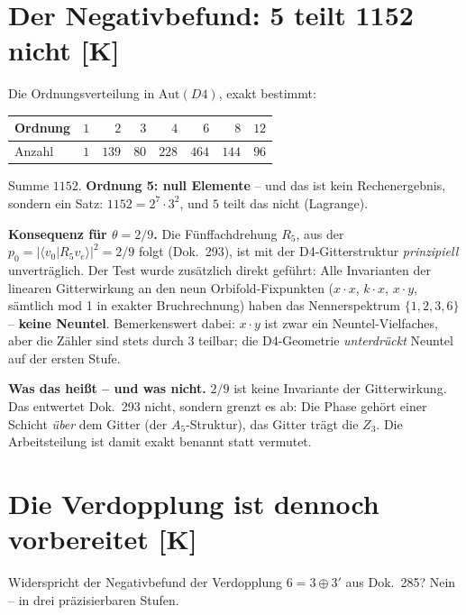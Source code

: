 \chapter{Der Negativbefund: 5 teilt 1152 nicht [K]}

Die Ordnungsverteilung in $\text{Aut}(D4)$, exakt bestimmt:

\begin{center}
\begin{tabular}{lrrrrrrr}
\toprule
Ordnung & $1$ & $2$ & $3$ & $4$ & $6$ & $8$ & $12$ \\
\midrule
Anzahl & $1$ & $139$ & $80$ & $228$ & $464$ & $144$ & $96$ \\
\bottomrule
\end{tabular}
\end{center}

Summe $1152$. \textbf{Ordnung 5: null Elemente} -- und das ist kein
Rechenergebnis, sondern ein Satz: $1152 = 2^7\cdot3^2$, und $5$
teilt das nicht (Lagrange).

\textbf{Konsequenz für $\theta = 2/9$.} Die Fünffachdrehung $R_5$,
aus der $p_0 = |\langle v_0|R_5 v_e\rangle|^2 = 2/9$ folgt
(Dok.~293), ist mit der D4-Gitterstruktur \emph{prinzipiell}
unverträglich. Der Test wurde zusätzlich direkt geführt: Alle
Invarianten der linearen Gitterwirkung an den neun Orbifold-Fixpunkten
($x\!\cdot\!x$, $k\!\cdot\!x$, $x\!\cdot\!y$, sämtlich mod 1 in exakter
Bruchrechnung) haben das Nennerspektrum $\{1,2,3,6\}$ --
\textbf{keine Neuntel}. Bemerkenswert dabei: $x\!\cdot\!y$ ist zwar
ein Neuntel-Vielfaches, aber die Zähler sind stets durch 3 teilbar;
die D4-Geometrie \emph{unterdrückt} Neuntel auf der ersten Stufe.

\textbf{Was das heißt -- und was nicht.} $2/9$ ist keine Invariante
der Gitterwirkung. Das entwertet Dok.~293 nicht, sondern grenzt es
ab: Die Phase gehört einer Schicht \emph{über} dem Gitter (der
$A_5$-Struktur), das Gitter trägt die $Z_3$. Die Arbeitsteilung ist
damit exakt benannt statt vermutet.

\chapter{Die Verdopplung ist dennoch vorbereitet [K]}

Widerspricht der Negativbefund der Verdopplung $6 = 3\oplus3'$ aus
Dok.~285? Nein -- in drei präzisierbaren Stufen.

